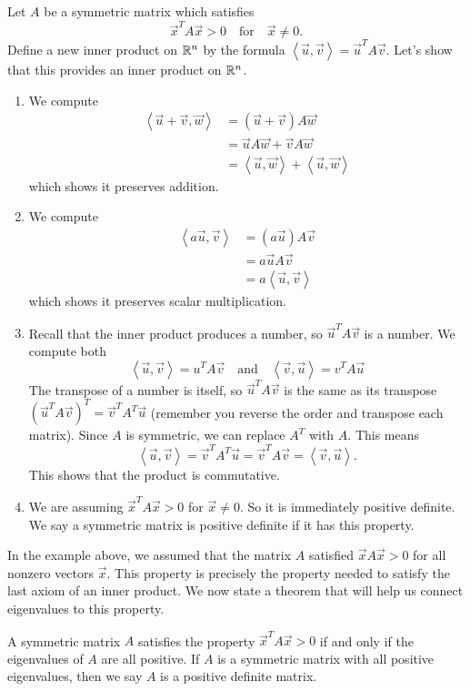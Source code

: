 \begin{example}
Let $A$ be a symmetric matrix which satisfies $$\vec x^T A\vec x> 0\quad \text{for}\quad \vec x\neq 0.$$ 
Define a new inner product on $\mathbb{R}^n$ by the formula $\left<\vec u,\vec v\right> = \vec u^T A \vec v$. 
Let's show that this provides an inner product on $\mathbb{R}^n$.
\begin{enumerate}
	\item We compute \begin{align*} 
	\left<\vec u +\vec v,\vec w\right> 
	& =(\vec u+\vec v) A \vec w \\
	&=\vec uA\vec w+\vec vA \vec w  \\
	&= \left<\vec u,\vec w\right> +\left<\vec u,\vec w\right> 
	\end{align*}
	which shows it preserves addition.

	\item We compute \begin{align*} 
	\left<a\vec u ,\vec v\right> 
	& =(a\vec u) A \vec v \\
	&=a\vec uA\vec v \\
	&= a\left<\vec u,\vec v\right> 
	\end{align*}
	which shows it preserves scalar multiplication.
	\item Recall that the inner product produces a number, so $\vec u^T A \vec v$ is a number.  
	We compute both 
	$$\left<\vec u ,\vec v\right> = u^TA\vec v 
	\quad\text{and}\quad 
	\left<\vec v ,\vec u\right> = v^TA\vec u
	$$ 
	The transpose of a number is itself, so $\vec u^T A \vec v$ is the same as its transpose $(\vec u^T A \vec v)^T = \vec v^T A^T\vec u$ (remember you reverse the order and transpose each matrix).  
	Since $A$ is symmetric, we can replace $A^T$ with $A$. This means  
	$$\left<\vec u, \vec v \right> = \vec v^T A^T\vec u= \vec v^T A\vec v = \left<\vec v,\vec u\right>.$$ This shows that the product is commutative.
	\item We are assuming $\vec x^T A\vec x> 0$ for $\vec x\neq 0$. So it is immediately positive definite.  We say a symmetric matrix is positive definite if it has this property.
\end{enumerate}
\end{example}

In the example above, we assumed that the matrix $A$ satisfied $\vec x A \vec x>0$ for all nonzero vectors $\vec x$. This property is precisely the property needed to satisfy the last axiom of an inner product. We now state a theorem that will help us connect eigenvalues to this property.
\begin{theorem}
A symmetric matrix $A$ satisfies the property $\vec x^T A\vec x>0$ if and only if the eigenvalues of $A$ are all positive.
If $A$ is a symmetric matrix with all positive eigenvalues, then we say $A$ is a positive definite matrix. 
\end{theorem}

